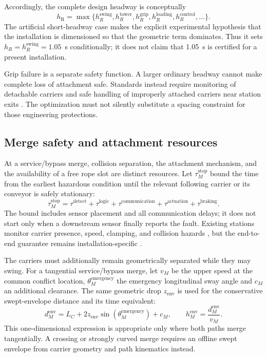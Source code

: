 \documentclass[11pt,a4paper]{scrartcl}
\newcommand{\hlinehaul}{h_{\mathrm R}}
\begin{document}
Accordingly, the complete design headway is conceptually
\begin{equation}
\hlinehaul=\max\{h_R^{\mathrm{swing}},h_R^{\mathrm{tower}},
h_R^{\mathrm{grip}},h_R^{\mathrm{loading}},h_R^{\mathrm{control}},\ldots\}.
\label{eq:complete-rope-headway}
\end{equation}
The artificial short-headway case makes the explicit experimental hypothesis
that the installation is dimensioned so that the geometric term dominates.
Thus it sets $h_R=h_R^{\mathrm{swing}}=1.05$~s conditionally; it does not claim
that 1.05~s is certified for a present installation.

Grip failure is a separate safety function.  A larger ordinary headway cannot
make complete loss of attachment safe.  Standards instead require monitoring
of detachable carriers and safe handling of improperly attached carriers near
station exits \cite[Secs.~5.4.2 and 9.3.2]{en12929}.  The optimization must not
silently substitute a spacing constraint for those engineering protections.

\subsection{Merge safety and attachment resources}

At a service/bypass merge, collision separation, the attachment mechanism, and
the availability of a free rope slot are distinct resources.  Let
$\tau_M^{\mathrm{stop}}$ bound the time from the earliest hazardous condition
until the relevant following carrier or its conveyor is safely stationary:
\begin{equation}
\tau_M^{\mathrm{stop}}
=\tau^{\mathrm{detect}}+\tau^{\mathrm{logic}}
 +\tau^{\mathrm{communication}}+\tau^{\mathrm{actuation}}
 +\tau^{\mathrm{braking}}.
\label{eq:merge-stop-time}
\end{equation}
The bound includes sensor placement and all communication delays; it does not
start only when a downstream sensor finally reports the fault.  Existing
stations monitor carrier presence, speed, clamping, and collision hazards
\cite{stationSafetyDevices2017}, but the end-to-end guarantee remains
installation-specific \cite[Sec.~9.3.2]{en12929}.

The carriers must additionally remain geometrically separated while they may
swing.  For a tangential service/bypass merge, let $v_M$ be the upper speed at
the common conflict location, $\theta_M^{\mathrm{emergency}}$ the emergency
longitudinal sway angle and $c_M$ an additional clearance.  The same geometric
drop $z_{\mathrm{env}}$ is used for the conservative swept-envelope distance
and its time equivalent:
\begin{equation}
d_M^{\mathrm{env}}
 =L_C+2z_{\mathrm{env}}\sin(\theta_M^{\mathrm{emergency}})+c_M,
\qquad
h_M^{\mathrm{env}}=\frac{d_M^{\mathrm{env}}}{v_M}.
\label{eq:merge-envelope-headway}
\end{equation}
This one-dimensional expression is appropriate only where both paths merge
tangentially.  A crossing or strongly curved merge requires an offline swept
envelope from carrier geometry and path kinematics instead.
\end{document}
